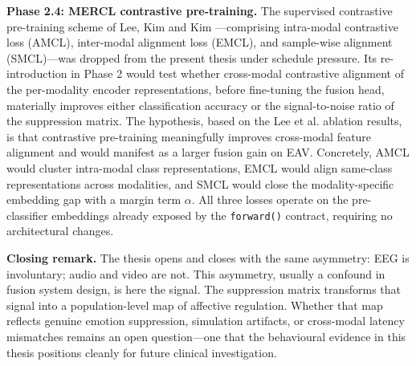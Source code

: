 \textbf{Phase 2.4: MERCL contrastive pre-training.} The supervised contrastive pre-training scheme of Lee, Kim and Kim \cite{Lee2024MERCL}---comprising intra-modal contrastive loss (AMCL), inter-modal alignment loss (EMCL), and sample-wise alignment (SMCL)---was dropped from the present thesis under schedule pressure. Its re-introduction in Phase 2 would test whether cross-modal contrastive alignment of the per-modality encoder representations, before fine-tuning the fusion head, materially improves either classification accuracy or the signal-to-noise ratio of the suppression matrix. The hypothesis, based on the Lee et al. ablation results, is that contrastive pre-training meaningfully improves cross-modal feature alignment and would manifest as a larger fusion gain on EAV. Concretely, AMCL would cluster intra-modal class representations, EMCL would align same-class representations across modalities, and SMCL would close the modality-specific embedding gap with a margin term $\alpha$. All three losses operate on the pre-classifier embeddings already exposed by the \texttt{forward()} contract, requiring no architectural changes.

\textbf{Closing remark.} The thesis opens and closes with the same asymmetry: EEG is involuntary; audio and video are not. This asymmetry, usually a confound in fusion system design, is here the signal. The suppression matrix transforms that signal into a population-level map of affective regulation. Whether that map reflects genuine emotion suppression, simulation artifacts, or cross-modal latency mismatches remains an open question---one that the behavioural evidence in this thesis positions cleanly for future clinical investigation.